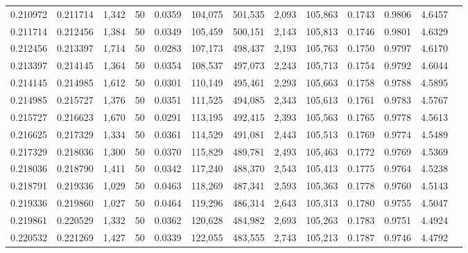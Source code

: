 \begin{tabular}{rrrrrrrrrrrrr}
0.210972 & 0.211714 & 1,342 &  50 &                                     0.0359 & 104,075 & 501,535 &   2,093 & 105,863 & 0.1743 & 0.9806 & 4.6457 \\
0.211714 & 0.212456 & 1,384 &  50 &                                     0.0349 & 105,459 & 500,151 &   2,143 & 105,813 & 0.1746 & 0.9801 & 4.6329 \\
0.212456 & 0.213397 & 1,714 &  50 &                                     0.0283 & 107,173 & 498,437 &   2,193 & 105,763 & 0.1750 & 0.9797 & 4.6170 \\
0.213397 & 0.214145 & 1,364 &  50 &                                     0.0354 & 108,537 & 497,073 &   2,243 & 105,713 & 0.1754 & 0.9792 & 4.6044 \\
0.214145 & 0.214985 & 1,612 &  50 &                                     0.0301 & 110,149 & 495,461 &   2,293 & 105,663 & 0.1758 & 0.9788 & 4.5895 \\
0.214985 & 0.215727 & 1,376 &  50 &                                     0.0351 & 111,525 & 494,085 &   2,343 & 105,613 & 0.1761 & 0.9783 & 4.5767 \\
0.215727 & 0.216623 & 1,670 &  50 &                                     0.0291 & 113,195 & 492,415 &   2,393 & 105,563 & 0.1765 & 0.9778 & 4.5613 \\
0.216625 & 0.217329 & 1,334 &  50 &                                     0.0361 & 114,529 & 491,081 &   2,443 & 105,513 & 0.1769 & 0.9774 & 4.5489 \\
0.217329 & 0.218036 & 1,300 &  50 &                                     0.0370 & 115,829 & 489,781 &   2,493 & 105,463 & 0.1772 & 0.9769 & 4.5369 \\
0.218036 & 0.218790 & 1,411 &  50 &                                     0.0342 & 117,240 & 488,370 &   2,543 & 105,413 & 0.1775 & 0.9764 & 4.5238 \\
0.218791 & 0.219336 & 1,029 &  50 &                                     0.0463 & 118,269 & 487,341 &   2,593 & 105,363 & 0.1778 & 0.9760 & 4.5143 \\
0.219336 & 0.219860 & 1,027 &  50 &                                     0.0464 & 119,296 & 486,314 &   2,643 & 105,313 & 0.1780 & 0.9755 & 4.5047 \\
0.219861 & 0.220529 & 1,332 &  50 &                                     0.0362 & 120,628 & 484,982 &   2,693 & 105,263 & 0.1783 & 0.9751 & 4.4924 \\
0.220532 & 0.221269 & 1,427 &  50 &                                     0.0339 & 122,055 & 483,555 &   2,743 & 105,213 & 0.1787 & 0.9746 & 4.4792 \\

\end{tabular}
